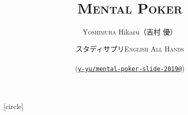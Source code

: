 \setmonofont[Ligatures=TeX]{CMU Typewriter Text}

\title[Mental Poker]{%
  {\bfseries\rmfamily\mcfamily\huge\scshape
    Mental Poker%
  }%
}
\author[Yoshimura Hikaru]{%
  \textsc{Yoshimura} Hikaru（吉村 優）
}
\date[September 17, 2019]{%
  スタディサプリ\textsc{English All Hands} \\
   \\
  {\scriptsize (\href{https://github.com/y-yu/mental-poker-slide-2019}{\texttt{y-yu/mental-poker-slide-2019@\GITAbrHash}})}%
}







[circle]

\newcommand\ballcircle[1]{%
  {%
    \usebeamercolor{enumerate item}%
    \tikzset{beameritem/.style={circle,inner sep=0,minimum size=2ex,text=enumerate item.bg,fill=enumerate item.fg,font=\footnotesize}}%
    \tikz[baseline=(n.base)]\node(n)[beameritem]{#1};%
  }
}
\newcommand\ballref[1]{%
  \ballcircle{\ref{#1}}
}

\newcommand\ce[1]{%
  \coloremoji{#1}
}

\newenvironment{notes}
  {%
    \begin{xlrbox}{NotesBox}
    \begin{minipage}{.95\textwidth}
    \small\rmfamily\mcfamily
    \begin{itemize}
    \setlength{\itemindent}{0em}
  }{%
    \end{itemize}
    \end{minipage}
    \end{xlrbox}
    \note{\theNotesBox}}

\makeatletter
\newsavebox\temp@simple@callout@box
\newcommand{\simplecallout}[3]{%
  \sbox{\temp@simple@callout@box}{\mbox{%
    \begin{tabular}{l}
      #3%
    \end{tabular}
  }}%
  \begin{center}%
    \begin{tikzpicture}%
      \calloutquote[width=1.05\wd\temp@simple@callout@box,position={(#1.5,-0.2)},fill=#2,rounded corners]{
        #3%
      }%
    \end{tikzpicture}%
  \end{center}
}
\makeatother



